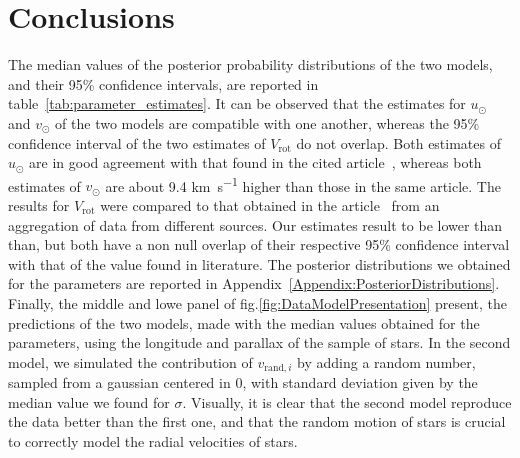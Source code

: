 \section{Conclusions}

The median values of the posterior probability distributions of the two models, and their 95\% confidence intervals, are reported in table~\ref{tab:parameter_estimates}. It can be observed that the estimates for $u_\odot$ and $v_\odot$ of the two models are compatible with one another, whereas the 95\% confidence interval of the two estimates of $V_{\text{rot}}$ do not overlap. Both estimates of $u_\odot$ are in good agreement with that found in the cited article~\cite{LocalKinematics}, whereas both estimates of $v_\odot$ are about 9.4 \unit{\kilo\meter\per\second} higher than those in the same article. The results for $V_{\text{rot}}$ were compared to that obtained in the article~\cite{GalacticKinematics} from an aggregation of data from different sources. Our estimates result to be lower than than, but both have a non null overlap of their respective 95\% confidence interval with that of the value found in literature. The posterior distributions we obtained for the parameters are reported in Appendix~\ref{Appendix:PosteriorDistributions}.
Finally, the middle and lowe panel of fig.\ref{fig:DataModelPresentation} present, the predictions of the two models, made with the median values obtained for the parameters, using the longitude and parallax of the sample of stars. In the second model, we simulated the contribution of $v_{\text{rand}, i}$ by adding a random number, sampled from a gaussian centered in 0, with standard deviation given by the median value we found for $\sigma$. Visually, it is clear that the second model reproduce the data better than the first one, and that the random motion of stars is crucial to correctly model the radial velocities of stars. 

